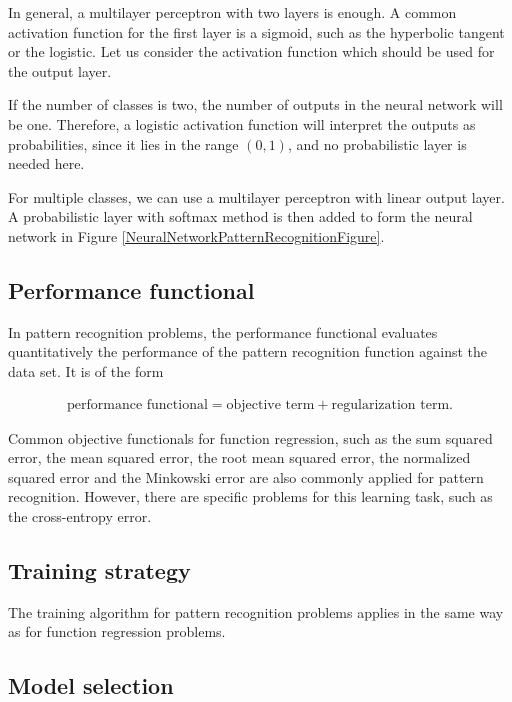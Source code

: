 In general, a multilayer perceptron with two layers is enough. 
A common activation function for the first layer is a sigmoid, such as the hyperbolic tangent or the logistic. 
Let us consider the activation function which should be used for the output layer. 

If the number of classes is two, the number of outputs in the neural network will be one. 
Therefore, a logistic activation function will interpret the outputs as probabilities, since it lies in the range $(0,1)$,
and no probabilistic layer is needed here. 

For multiple classes, we can use a multilayer perceptron with linear output layer. 
A probabilistic layer with softmax method is then added to form the neural network in Figure \ref{NeuralNetworkPatternRecognitionFigure}.

\subsection*{Performance functional}

In pattern recognition problems, the performance functional evaluates quantitatively the performance of the pattern recognition function against the data set. 
It is of the form

\begin{eqnarray}\label{PerformanceFunctionalPatternRecognition}\nonumber
\text{performance functional}=\text{objective term}+\text{regularization term}.
\end{eqnarray}

Common objective functionals for function regression, such as the sum squared error, the mean squared error, the root mean squared error, the normalized squared error and the Minkowski error are also commonly applied for pattern recognition. 
However, there are specific problems for this learning task, such as the cross-entropy error.

\subsection*{Training strategy}

The training algorithm for pattern recognition problems applies in the same way as for function regression problems. 

\subsection*{Model selection}

